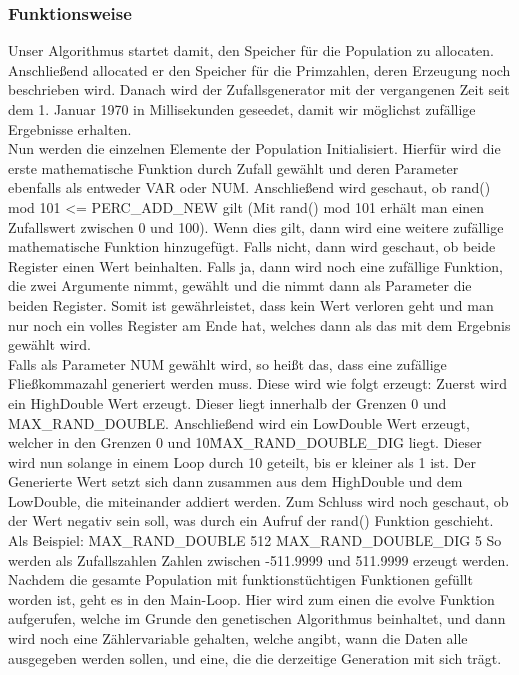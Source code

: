 \documentclass[a4paper,12pt]{article}
\begin{document}
\subsubsection{Funktionsweise}
Unser Algorithmus startet damit, den Speicher für die Population zu allocaten. Anschließend allocated er den Speicher für die Primzahlen, deren Erzeugung noch beschrieben wird. Danach wird der Zufallsgenerator mit der vergangenen Zeit seit dem 1. Januar 1970 in Millisekunden geseedet, damit wir möglichst zufällige Ergebnisse erhalten. \\

Nun werden die einzelnen Elemente der Population Initialisiert. Hierfür wird die erste mathematische Funktion durch Zufall gewählt und deren Parameter ebenfalls als entweder VAR oder NUM. Anschließend wird geschaut, ob rand() mod 101 <= PERC\_ADD\_NEW gilt (Mit rand() mod 101 erhält man einen Zufallswert zwischen 0 und 100).  Wenn dies gilt, dann wird eine weitere zufällige mathematische Funktion hinzugefügt. Falls nicht, dann wird geschaut, ob beide Register einen Wert beinhalten. Falls ja, dann wird noch eine zufällige Funktion, die zwei Argumente nimmt, gewählt und die nimmt dann als Parameter die beiden Register. Somit ist gewährleistet, dass kein Wert verloren geht und man nur noch ein volles Register am Ende hat, welches dann als das mit dem Ergebnis gewählt wird. \\

Falls als Parameter NUM gewählt wird, so heißt das, dass eine zufällige Fließkommazahl generiert werden muss. Diese wird wie folgt erzeugt:
Zuerst wird ein HighDouble Wert erzeugt. Dieser liegt innerhalb der Grenzen 0 und MAX\_RAND\_DOUBLE. Anschließend wird ein LowDouble Wert erzeugt, welcher in den Grenzen 0 und 10\^MAX\_RAND\_DOUBLE\_DIG liegt. Dieser wird nun solange in einem Loop durch 10 geteilt, bis er kleiner als 1 ist. Der Generierte Wert setzt sich dann zusammen aus dem HighDouble und dem LowDouble, die miteinander addiert werden. Zum Schluss wird noch geschaut, ob der Wert negativ sein soll, was durch ein Aufruf der rand() Funktion geschieht. 
Als Beispiel:
MAX\_RAND\_DOUBLE 512
MAX\_RAND\_DOUBLE\_DIG 5
So werden als Zufallszahlen Zahlen zwischen -511.9999 und 511.9999 erzeugt werden. \\

Nachdem die gesamte Population mit funktionstüchtigen Funktionen gefüllt worden ist, geht es in den Main-Loop. Hier wird zum einen die evolve Funktion aufgerufen, welche im Grunde den genetischen Algorithmus beinhaltet, und dann wird noch eine Zählervariable gehalten, welche angibt, wann die Daten alle ausgegeben werden sollen, und eine, die die derzeitige Generation mit sich trägt.\\
\end{document}
